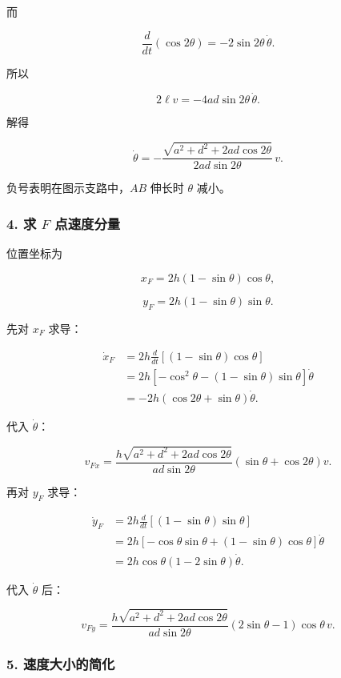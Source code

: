 \documentclass[12pt,a4paper,UTF8]{ctexart}
\begin{document}
而

\[
\frac{d}{dt}(\cos2\theta)
=-2\sin2\theta\,\dot\theta.
\]

所以

\[
2\ell v=-4ad\sin2\theta\,\dot\theta.
\]

解得

\[
\boxed{
\dot\theta
=-\frac{\sqrt{a^2+d^2+2ad\cos2\theta}}
{2ad\sin2\theta}\,v
}.
\]

负号表明在图示支路中，\(AB\) 伸长时 \(\theta\) 减小。

\subsubsection{\texorpdfstring{4. 求 \(F\)
点速度分量}{4. 求 F 点速度分量}}\label{ux6c42-f-ux70b9ux901fux5ea6ux5206ux91cf}

位置坐标为

\[
x_F=2h(1-\sin\theta)\cos\theta,
\]

\[
y_F=2h(1-\sin\theta)\sin\theta.
\]

先对 \(x_F\) 求导：

\[
\begin{aligned}
\dot x_F
&=2h\frac{d}{dt}\left[(1-\sin\theta)\cos\theta\right]\\
&=2h\left[-\cos^2\theta-(1-\sin\theta)\sin\theta\right]\dot\theta\\
&=-2h\left(\cos2\theta+\sin\theta\right)\dot\theta.
\end{aligned}
\]

代入 \(\dot\theta\)：

\[
\boxed{
v_{Fx}
=\frac{h\sqrt{a^2+d^2+2ad\cos2\theta}}
{ad\sin2\theta}
(\sin\theta+\cos2\theta)v
}.
\]

再对 \(y_F\) 求导：

\[
\begin{aligned}
\dot y_F
&=2h\frac{d}{dt}\left[(1-\sin\theta)\sin\theta\right]\\
&=2h\left[-\cos\theta\sin\theta+(1-\sin\theta)\cos\theta\right]\dot\theta\\
&=2h\cos\theta(1-2\sin\theta)\dot\theta.
\end{aligned}
\]

代入 \(\dot\theta\) 后：

\[
\boxed{
v_{Fy}
=\frac{h\sqrt{a^2+d^2+2ad\cos2\theta}}
{ad\sin2\theta}
(2\sin\theta-1)\cos\theta\,v
}.
\]

\subsubsection{5.
速度大小的简化}\label{ux901fux5ea6ux5927ux5c0fux7684ux7b80ux5316}
\end{document}
